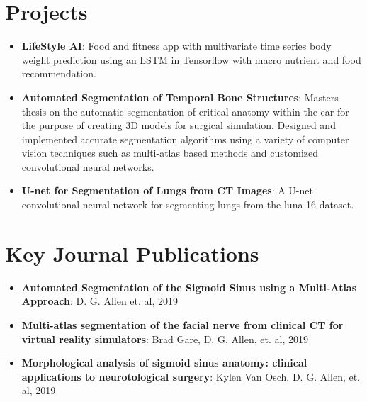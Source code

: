 \documentclass[letterpaper,11pt]{article}
\newcommand{\resumeItem}[2]{
  \item\small{
    \textbf{#1}{: #2 \vspace{-2pt}}
  }
}
\newcommand{\resumeSubItem}[2]{\resumeItem{#1}{#2}\vspace{-4pt}}
\newcommand{\resumeSubHeadingListStart}{\begin{itemize}[leftmargin=*]}
\newcommand{\resumeSubHeadingListEnd}{\end{itemize}}
\begin{document}
\section{Projects}
  \resumeSubHeadingListStart
    \resumeSubItem{LifeStyle AI}
      {Food and fitness app with multivariate time series body weight prediction using an LSTM in Tensorflow with macro nutrient and food recommendation.}
    \resumeSubItem{Automated Segmentation of Temporal Bone Structures}
      {Masters thesis on the automatic segmentation of critical anatomy within the ear for the purpose of creating 3D models for surgical simulation. Designed and implemented accurate segmentation algorithms using a variety of computer vision techniques such as multi-atlas based methods and customized convolutional neural networks.}
    \resumeSubItem{U-net for Segmentation of Lungs from CT Images}
      {A U-net convolutional neural network for segmenting lungs from the luna-16 dataset.}
  \resumeSubHeadingListEnd

\section{Key Journal Publications}
	\resumeSubHeadingListStart
		\resumeSubItem{Automated Segmentation of the Sigmoid Sinus using a Multi-Atlas Approach}{D. G. Allen et. al, 2019}
		\resumeSubItem{Multi-atlas segmentation of the facial nerve from clinical CT for virtual reality simulators}{Brad Gare, D. G. Allen, et. al, 2019}
		\resumeSubItem{Morphological analysis of sigmoid sinus anatomy: clinical applications to neurotological surgery}{Kylen Van Osch, D. G. Allen, et. al, 2019}
	\resumeSubHeadingListEnd
	  

\end{document}
